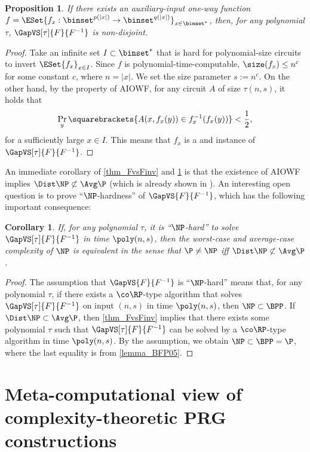 \documentclass[11pt]{article}
\numberwithin{equation}{section}
\newtheorem{proposition}[theorem]{Proposition}
\newtheorem{corollary}[theorem]{Corollary}
\theoremstyle{definition}
\theoremstyle{plain}
\begin{document}
\begin{proposition}
  \label{prop_AIOWF}
  If there exists an auxiliary-input one-way function
  $f = \ESet{ f_x : \binset^{p(|x|)} \to \binset^{q(|x|)} }_{x \in \binset^*}$,
  then,
  for any polynomial $\tau$,
  $\GapVS[\tau]{F}{F^{-1}}$ is non-disjoint.
\end{proposition}
\begin{proof}
  Take an infinite set $I \subset \binset^*$ that is hard for polynomial-size circuits to invert $\ESet{f_x}_{x \in I}$.
  Since $f$ is polynomial-time-computable, $\size(f_x) \le n^c$ for some constant $c$,
  where $n = |x|$.
  We set the size parameter $s := n^c$.
  On the other hand,
  by the property of AIOWF,
  for any circuit $A$ of size $\tau(n, s)$,
  it holds that
  $$\Pr_y \squarebrackets{ A(x, f_x(y)) \in f_x^{-1}(f_x(y)) } < \frac{1}{2},$$
  for a sufficiently large $x \in I$.
  This means that $f_x$ is a \Yes and \No instance of $\GapVS[\tau]{F}{F^{-1}}$.
\end{proof}

An immediate corollary of
\cref{thm_FvsFinv}
and
\cref{prop_AIOWF}
is that the existence of AIOWF implies $\Dist\NP \not\subset \Avg\P$
(which is already shown in \cite{Hirahara18_focs_conf}).
An interesting open question is to prove ``$\NP$-hardness'' of $\GapVS{F}{F^{-1}}$,
which has the following important consequence:
\begin{corollary}
  If,
  for any polynomial $\tau$,
  it is \textup{``}$\NP$-hard\textup{''} to solve $\GapVS[\tau]{F}{F^{-1}}$ in time $\poly(n, s)$,
  then
  the worst-case and average-case complexity of $\NP$ is equivalent
  in the sense that $\P \neq \NP$ iff $\Dist\NP \not\subset \Avg\P$.
\end{corollary}

\begin{proof}
  The assumption that
  $\GapVS{F}{F^{-1}}$
  is ``$\NP$-hard''
  means that, for any polynomial $\tau$,
  if there exists a $\co\RP$-type algorithm
  that solves $\GapVS[\tau]{F}{F^{-1}}$
  on input $(n, s)$ in time $\poly(n, s)$,
  then
  $\NP \subset \BPP$.
  If $\Dist\NP \subset \Avg\P$,
  then
  \cref{thm_FvsFinv}
  implies that
  there exists some polynomial $\tau$ such that
  $\GapVS[\tau]{F}{F^{-1}}$ can be solved by a $\co\RP$-type algorithm
  in time $\poly(n, s)$.
  By the assumption, we obtain $\NP \subset \BPP = \P$, where the last equality is from \cref{lemma_BFP05}.
\end{proof}


\section{Meta-computational view of complexity-theoretic PRG constructions}
\label{section_Genral}
\end{document}
